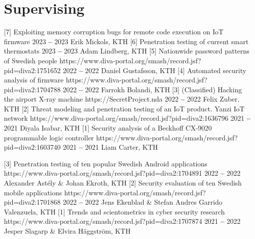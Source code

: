 

\section{Supervising}

  

        \cvItem
            {[7] Exploiting memory corruption bugs for remote code execution on IoT firmware}
            {}
            {2023 \textbf{--} 2023}
            {Erik Mickols, KTH}
            {}
        \cvItem
            {[6] Penetration testing of current smart thermostats}
            {}
            {2023 \textbf{--} 2023}
            {Adam Lindberg, KTH}
            {}
        \cvItem
            {[5] Nationwide password patterns of Swedish people}
            {https://www.diva-portal.org/smash/record.jsf?pid=diva2:1751652}
            {2022 \textbf{--} 2022}
            {Daniel Gustafsson, KTH}
            {}
        \cvItem
            {[4] Automated security analysis of firmware}
            {https://www.diva-portal.org/smash/record.jsf?pid=diva2:1704788}
            {2022 \textbf{--} 2022}
            {Farrokh Bolandi, KTH}
            {}
        \cvItem
            {[3] (Classified) Hacking the airport X-ray machine}
            {https://SecretProject.nda}
            {2022 \textbf{--} 2022}
            {Felix Zuber, KTH}
            {}
        \cvItem
            {[2] Threat modeling and penetration testing of an IoT product. Yanzi IoT network}
            {https://www.diva-portal.org/smash/record.jsf?pid=diva2:1636796}
            {2021 \textbf{--} 2021}
            {Diyala Isabar, KTH}
            {}
        \cvItem
            {[1] Security analysis of a Beckhoff CX-9020 programmable logic controller}
            {https://www.diva-portal.org/smash/record.jsf?pid=diva2:1603740}
            {2021 \textbf{--} 2021} 
            {Liam Carter, KTH}
            {}
    
    \itemizeCVEnd


        
        \cvItem
            {[3] Penetration testing of ten popular Swedish Android applications}
            {https://www.diva-portal.org/smash/record.jsf?pid=diva2:1704891}
            {2022 \textbf{--} 2022}
            {Alexander Astély \& Johan Ekroth, KTH}
            {}
        \cvItem
            {[2] Security evaluation of ten Swedish mobile applications}
            {https://www.diva-portal.org/smash/record.jsf?pid=diva2:1701868}
            {2022 \textbf{--} 2022}
            {Jens Ekenblad \& Stefan Andres Garrido Valenzuela, KTH}
            {}
        \cvItem
            {[1] Trends and scientometrics in cyber security research}
            {https://www.diva-portal.org/smash/record.jsf?pid=diva2:1707874}
            {2021 \textbf{--} 2022}
            {Jesper Slagarp \& Elvira Häggström, KTH}
            {}
    
    \itemizeCVEnd
    